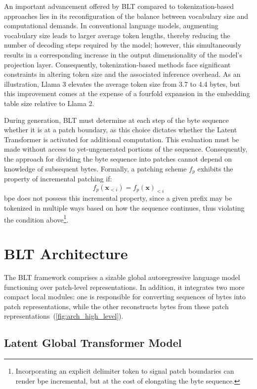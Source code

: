 An important advancement offered by {\textsc BLT} compared to tokenization-based approaches lies in its reconfiguration of the balance between vocabulary size and computational demands. In conventional language models, augmenting vocabulary size leads to larger average token lengths, thereby reducing the number of decoding steps required by the model; however, this simultaneously results in a corresponding increase in the output dimensionality of the model’s projection layer. Consequently, tokenization-based methods face significant constraints in altering token size and the associated inference overhead. As an illustration, Llama 3 elevates the average token size from 3.7 to 4.4 bytes, but this improvement comes at the expense of a fourfold expansion in the embedding table size relative to Llama 2.

During generation, {\textsc BLT} must determine at each step of the byte sequence whether it is at a patch boundary, as this choice dictates whether the Latent Transformer is activated for additional computation. This evaluation must be made without access to yet-ungenerated portions of the sequence. Consequently, the approach for dividing the byte sequence into patches cannot depend on knowledge of subsequent bytes. Formally, a patching scheme $f_p$ exhibits the property of incremental patching if:
$$f_p(\pmb{x}_{<i}) = f_p(\pmb{x})_{<i}$$
bpe does not possess this incremental property, since a given prefix may be tokenized in multiple ways based on how the sequence continues, thus violating the condition above\footnote{Incorporating an explicit delimiter token to signal patch boundaries can render bpe incremental, but at the cost of elongating the byte sequence.}.

\section{{\textsc BLT} Architecture}
\label{section:architecture}
The {\textsc BLT} framework comprises a sizable global autoregressive language model functioning over patch-level representations. In addition, it integrates two more compact local modules: one is responsible for converting sequences of bytes into patch representations, while the other reconstructs bytes from these patch representations~(\autoref{fig:arch_high_level}).

\subsection{Latent Global Transformer Model}

